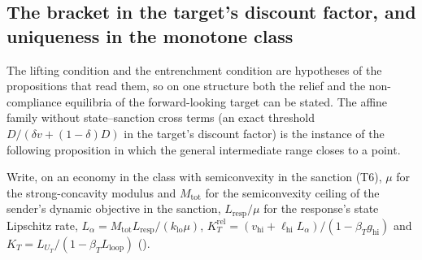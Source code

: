 \subsection{The bracket in the target's discount factor, and uniqueness in the monotone class}
\label{app:proofs:threshold}

The lifting condition and the entrenchment condition are hypotheses of the
propositions that read them, so on one structure both the relief and the non-compliance
equilibria of the forward-looking target can be stated. The affine family without
state--sanction cross terms (an exact threshold $D/(\delta v+(1-\delta)D)$ in the
target's discount factor) is the instance of the following
proposition in which the general intermediate range closes to a point.

Write, on an economy in the class with semiconvexity in the sanction (T6), $\mu$
for the strong-concavity modulus and $M_{\mathrm{tot}}$ for the semiconvexity
ceiling of the sender's dynamic objective in the sanction, $L_{\mathrm{resp}}/\mu$
for the response's state Lipschitz rate,
$L_\alpha=M_{\mathrm{tot}}L_{\mathrm{resp}}/(k_{\mathrm{lo}}\mu)$,
$K_T^{\mathrm{rel}}=(v_{\mathrm{hi}}+\ell_{\mathrm{hi}}L_\alpha)/(1-\beta_Tg_{\mathrm{hi}})$ and
$K_T=L_{U_T}/(1-\beta_TL_{\mathrm{loop}})$ ().

